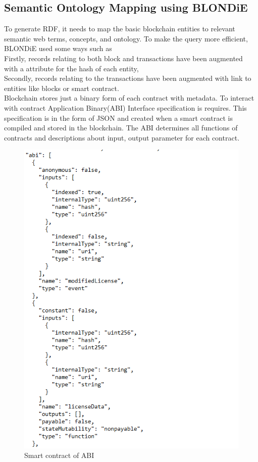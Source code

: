 \subsection{Semantic Ontology Mapping using BLONDiE} 
To generate RDF, it needs to map the basic blockchain entities to relevant semantic web terms, concepts, and ontology. To make the query more efficient, BLONDiE used some ways such as \\  
Firstly, records relating to both block and transactions have been
augmented with a attribute for the hash of each entity,   \\
Secondly, records relating to the transactions have been augmented with link to entities like blocks or smart contract.\\
Blockchain stores just a binary form of each contract with metadata.   
To interact with contract Application Binary(ABI) Interface specification is requires. This specification is in the form of JSON and created when a smart contract is compiled and stored in the blockchain. The ABI determines all functions of contracts and descriptions about input, output parameter for each contract\cite{Third}.

\begin{center}
	\begin{figure}[htb!]
		
		\begin{minipage}{0.55\linewidth}
			\centering
			\includegraphics[width=1.95\textwidth]{images/chap02_SmartContract_ABI.png}
		\end{minipage}
		\caption[Smart contract of ABI]{Smart  contract of ABI}
		
	\end{figure}
	
\end{center}



